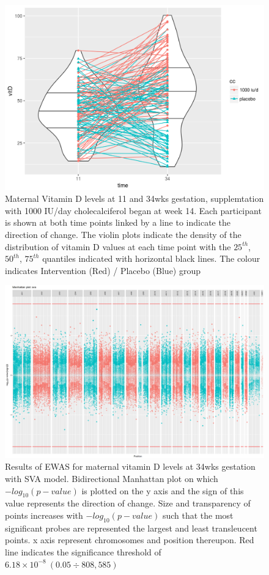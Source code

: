 \documentclass[]{book}
\begin{document}
\begin{figure}

{\centering \includegraphics[width=0.8\linewidth]{figs/MAVIDOSvitDviolinMonApr162018} 

}

\caption{Maternal Vitamin D levels at 11 and 34wks gestation, supplemtation with 1000 IU/day cholecalciferol began at week 14. Each participant is shown at both time points linked by a line to indicate the direction of change. The violin plots indicate the density of the distribution of vitamin D values at each time point with the \(25^{th}\), \(50^{th}\), \(75^{th}\) quantiles indicated with horizontal black lines. The colour indicates Intervention (Red) / Placebo (Blue) group}\label{fig:MAVIDOSvitDviolinMonApr162018}
\end{figure}



\begin{figure}

{\centering \includegraphics[width=0.8\linewidth]{figs/MAVIDOSmVitD34EPICewasManhattanSVA} 

}

\caption{Results of EWAS for maternal vitamin D levels at 34wks gestation with SVA model. Bidirectional Manhattan plot on which \(-log_{10}(p-value)\) is plotted on the y axis and the sign of this value represents the direction of change. Size and transparency of points increases with \(-log_{10}(p-value)\) such that the most significant probes are represented the largest and least transleucent points. x axis represent chromosomes and position thereupon. Red line indicates the significance threshold of \(6.18\times10^{-8}~(0.05\div808,585)\)}\label{fig:MAVIDOSmVitD34EPICewasManhattanSVA}
\end{figure}
\end{document}
